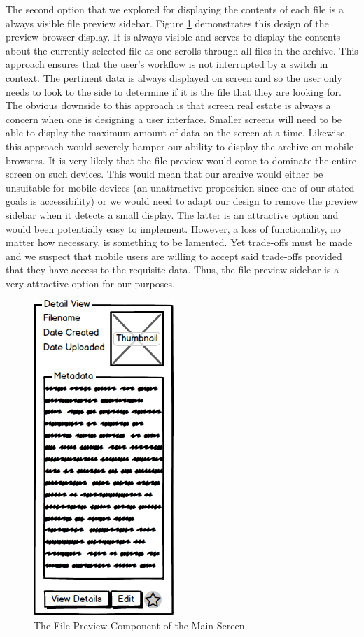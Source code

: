 \documentclass[12pt]{report}
\begin{document}
\begin{enumerate}
The second option that we explored for displaying the contents of each file is a always visible file preview sidebar. Figure \ref{fig:frontendfilepreview} demonstrates this design of the preview browser display. It is always visible and serves to display the contents about the currently selected file as one scrolls through all files in the archive. This approach ensures that the user's workflow is not interrupted by a switch in context. The pertinent data is always displayed on screen and so the user only needs to look to the side to determine if it is the file that they are looking for. The obvious downside to this approach is that screen real estate is always a concern when one is designing a user interface. Smaller screens will need to be able to display the maximum amount of data on the screen at a time. Likewise, this approach would severely hamper our ability to display the archive on mobile browsers. It is very likely that the file preview would come to dominate the entire screen on such devices. This would mean that our archive would either be unsuitable for mobile devices (an unattractive proposition since one of our stated goals is accessibility) or we would need to adapt our design to remove the preview sidebar when it detects a small display. The latter is an attractive option and would been potentially easy to implement. However, a loss of functionality, no matter how necessary, is something to be lamented. Yet trade-offs must be made and we suspect that mobile users are willing to accept said trade-offs provided that they have access to the requisite data. Thus, the file preview sidebar is a very attractive option for our purposes.

\begin{figure}[h]
	\centering
	\includegraphics[scale=0.5]{frontend_file_preview}
	\caption{The File Preview Component of the Main Screen}
	\label{fig:frontendfilepreview}
\end{figure}


\end{enumerate}
\end{document}
